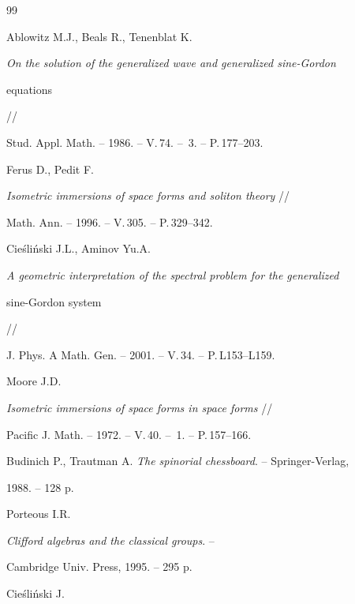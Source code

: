 \begin{thebibliography}{99}


Ablowitz M.J., Beals R., Tenenblat K.


{\em On the solution of the generalized wave and generalized sine-Gordon


equations} //


Stud. Appl. Math. -- 1986. -- V.\,74. -- \No\,3. -- P.\,177--203.







Ferus D., Pedit F.


{\em Isometric immersions of space forms and soliton theory} //


Math. Ann. -- 1996. -- V.\,305. -- P.\,329--342.







Cie\'sli\'nski J.L., Aminov Yu.A.


{\em A geometric interpretation of the spectral problem for the generalized 


sine-Gordon system} //


J. Phys. A Math. Gen. -- 2001. -- V.\,34. -- P.\,L153--L159.







Moore J.D.


{\em Isometric immersions of space forms in space forms} //


Pacific J. Math. -- 1972. -- V.\,40. -- \No\,1. -- P.\,157--166.







Budinich P., Trautman A. {\em The spinorial chessboard}. -- Springer-Verlag,


1988. -- 128 p.







Porteous I.R.


{\em Clifford algebras and the classical groups}. -- 


Cambridge Univ. Press, 1995. -- 295 p.







Cie\'sli\'nski J.



\end{thebibliography}
